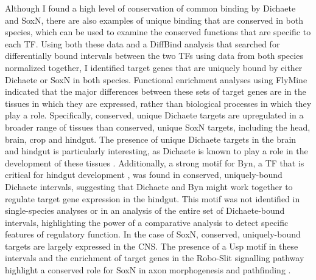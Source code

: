 Although I found a high level of conservation of common binding by Dichaete and SoxN, there are also examples of unique binding that are conserved in both species, which can be used to examine the conserved functions that are specific to each TF. Using both these data and a DiffBind analysis that searched for differentially bound intervals between the two TFs using data from both species normalized together, I identified target genes that are uniquely bound by either Dichaete or SoxN in both species. Functional enrichment analyses using FlyMine indicated that the major differences between these sets of target genes are in the tissues in which they are expressed, rather than biological processes in which they play a role. Specifically, conserved, unique Dichaete targets are upregulated in a broader range of tissues than conserved, unique SoxN targets, including the head, brain, crop and hindgut. The presence of unique Dichaete targets in the brain and hindgut is particularly interesting, as Dichaete is known to play a role in the development of these tissues \citep{sanchez-soriano_regulatory_2000}. Additionally, a strong motif for Byn, a TF that is critical for hindgut development \citep{kispert_homologs_1994,murakami_developmental_1999}, was found in conserved, uniquely-bound Dichaete intervals, suggesting that Dichaete and Byn might work together to regulate target gene expression in the hindgut. This motif was not identified in single-species analyses or in an analysis of the entire set of Dichaete-bound intervals, highlighting the power of a comparative analysis to detect specific features of regulatory function. In the case of SoxN, conserved, uniquely-bound targets are largely expressed in the CNS. The presence of a Usp motif in these intervals and the enrichment of target genes in the Robo-Slit signalling pathway highlight a conserved role for SoxN in axon morphogenesis and pathfinding \citep{ferrero_soxneuro_2014,girard_chromatin_2006,lee_cell-autonomous_????,parrish_genome-wide_2006}.

